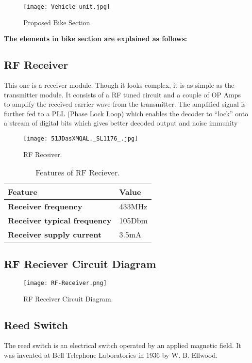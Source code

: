 \begin{figure}[h]
	\centering
	\texttt{[image: Vehicle unit.jpg]}
	\caption{Proposed Bike Section.}
\end{figure}\vspace{.3cm}

\textbf{The elements in bike section are explained as follows:}

\subsection{RF Receiver}
This one is a receiver module. Though it looks complex, it is as simple as the transmitter module. It consists of a RF tuned circuit and a couple of OP Amps to amplify the received carrier wave from the transmitter. The amplified signal is further fed to a PLL (Phase Lock Loop) which enables the decoder to “lock” onto a stream of digital bits which gives better decoded output and noise immunity

\begin{figure}[h]
	\centering
	\texttt{[image: 51JDasXMQAL.\_SL1176\_.jpg]}
	\caption{RF Receiver.}
\end{figure}

\begin{table}[h]
	\begin{center}
		
		\begin{tabular}{l|l} 
			\textbf{Feature} & \textbf{Value} \\
			\hline
			\textbf{Receiver frequency} & 433MHz\\
			\textbf{Receiver typical frequency }	& 105Dbm\\
			\textbf{Receiver supply current} & 3.5mA\\
			
			
		\end{tabular}
		\caption{Features of RF Reciever.}
	\end{center}
\end{table}
\subsection{RF Reciever Circuit Diagram}
\begin{figure}[h]
	\centering
	\texttt{[image: RF-Receiver.png]}
	\caption{RF Receiver Circuit Diagram.}
\end{figure}


\subsection{Reed Switch}
The reed switch is an electrical switch operated by an applied magnetic field. It was invented at Bell Telephone Laboratories in 1936 by W. B. Ellwood.\vspace{.3cm}

